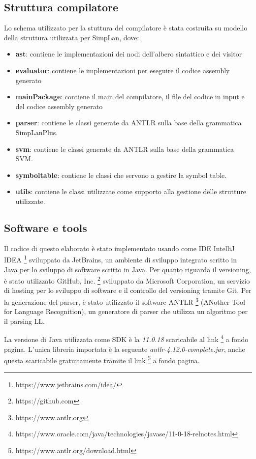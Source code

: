 \subsection{Struttura compilatore}
Lo schema utilizzato per la stuttura del compilatore è stata costruita su modello della struttura utilizzata per SimpLan, dove: 
\begin{itemize}
    \item \textbf{ast}: contiene le implementazioni dei nodi dell'albero sintattico e dei visitor 
    \item \textbf{evaluator}: contiene le implementazioni per eseguire il codice assembly generato
    \item \textbf{mainPackage}: contiene il main del compilatore, il file del codice in input e del codice assembly generato
    \item \textbf{parser}: contiene le classi generate da ANTLR sulla base della grammatica SimpLanPlus. 
    \item \textbf{svm}: contiene le classi generate da ANTLR sulla base della grammatica SVM.
    \item \textbf{symboltable}: contiene le classi che servono a gestire la symbol table.
    \item \textbf{utils}: contiene le classi utilizzate come supporto alla gestione delle strutture utilizzate.
    
\end{itemize}

\subsection{Software e tools}
Il codice di questo elaborato è stato implementato usando come IDE IntelliJ IDEA \footnote{https://www.jetbrains.com/idea/} sviluppato da JetBrains, un ambiente di sviluppo integrato scritto in Java per lo sviluppo di software scritto in Java. Per quanto riguarda il versioning, è stato utilizzato GitHub, Inc. \footnote{https://github.com} sviluppato da Microsoft Corporation, un servizio di hosting per lo sviluppo di software e il controllo del versioning tramite Git. 
Per la generazione del parser, è stato utilizzato il software ANTLR \footnote{https://www.antlr.org} (ANother Tool for Language Recognition), un generatore di parser che utilizza un algoritmo per il parsing LL.

La versione di Java utilizzata come SDK è la \textit{11.0.18} scaricabile al link \footnote{https://www.oracle.com/java/technologies/javase/11-0-18-relnotes.html} a fondo pagina.
L'unica libreria importata è la seguente \textit{antlr-4.12.0-complete.jar}, anche questa scaricabile gratuitamente tramite il link \footnote{https://www.antlr.org/download.html} a fondo pagina. 


